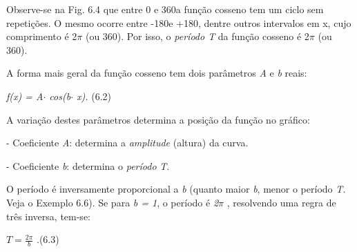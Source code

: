 Observe-se na Fig. 6.4 que entre 0 e 360\degree a função cosseno tem um ciclo sem repetições. O mesmo ocorre entre -180\degree e +180\degree, dentre outros intervalos em x, cujo comprimento é 2$ \pi $   (ou 360\degree). Por isso, o \textit{período T} da função cosseno é 2$ \pi $   (ou 360\degree). 

\begin{caixa}
A forma mais geral da função cosseno tem dois parâmetros \textit{A }e\textit{ b} reais:

\textit{f(x) = A$ \cdot $ cos(b$ \cdot $ x).} \tab (6.2)
\end{caixa}

A variação destes parâmetros determina a posição da função no gráfico:

- Coeficiente \textit{A}: determina a \textit{amplitude} (altura) da curva.

- Coeficiente \textit{b}: determina o \textit{período} \textit{T}.  

O período é inversamente proporcional a \textit{b }(quanto maior \textit{b}, menor o período \textit{T. }Veja o Exemplo 6.6). Se para \textit{b = 1}, o período é \textit{2$ \pi $ }, resolvendo uma regra de três inversa, tem-se:

 \( T=\frac{2 \pi }{b} \) .\tab \tab \tab \tab \tab \tab (6.3)


